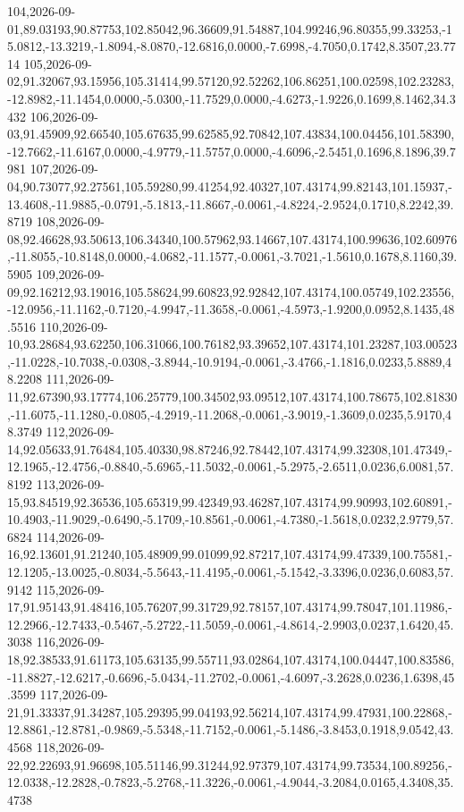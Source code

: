 \documentclass{eic-bcc-tcc}
\begin{document}
{104,2026-09-01,89.03193,90.87753,102.85042,96.36609,91.54887,104.99246,96.80355,99.33253,-15.0812,-13.3219,-1.8094,-8.0870,-12.6816,0.0000,-7.6998,-4.7050,0.1742,8.3507,23.7714
105,2026-09-02,91.32067,93.15956,105.31414,99.57120,92.52262,106.86251,100.02598,102.23283,-12.8982,-11.1454,0.0000,-5.0300,-11.7529,0.0000,-4.6273,-1.9226,0.1699,8.1462,34.3432
106,2026-09-03,91.45909,92.66540,105.67635,99.62585,92.70842,107.43834,100.04456,101.58390,-12.7662,-11.6167,0.0000,-4.9779,-11.5757,0.0000,-4.6096,-2.5451,0.1696,8.1896,39.7981
107,2026-09-04,90.73077,92.27561,105.59280,99.41254,92.40327,107.43174,99.82143,101.15937,-13.4608,-11.9885,-0.0791,-5.1813,-11.8667,-0.0061,-4.8224,-2.9524,0.1710,8.2242,39.8719
108,2026-09-08,92.46628,93.50613,106.34340,100.57962,93.14667,107.43174,100.99636,102.60976,-11.8055,-10.8148,0.0000,-4.0682,-11.1577,-0.0061,-3.7021,-1.5610,0.1678,8.1160,39.5905
109,2026-09-09,92.16212,93.19016,105.58624,99.60823,92.92842,107.43174,100.05749,102.23556,-12.0956,-11.1162,-0.7120,-4.9947,-11.3658,-0.0061,-4.5973,-1.9200,0.0952,8.1435,48.5516
110,2026-09-10,93.28684,93.62250,106.31066,100.76182,93.39652,107.43174,101.23287,103.00523,-11.0228,-10.7038,-0.0308,-3.8944,-10.9194,-0.0061,-3.4766,-1.1816,0.0233,5.8889,48.2208
111,2026-09-11,92.67390,93.17774,106.25779,100.34502,93.09512,107.43174,100.78675,102.81830,-11.6075,-11.1280,-0.0805,-4.2919,-11.2068,-0.0061,-3.9019,-1.3609,0.0235,5.9170,48.3749
112,2026-09-14,92.05633,91.76484,105.40330,98.87246,92.78442,107.43174,99.32308,101.47349,-12.1965,-12.4756,-0.8840,-5.6965,-11.5032,-0.0061,-5.2975,-2.6511,0.0236,6.0081,57.8192
113,2026-09-15,93.84519,92.36536,105.65319,99.42349,93.46287,107.43174,99.90993,102.60891,-10.4903,-11.9029,-0.6490,-5.1709,-10.8561,-0.0061,-4.7380,-1.5618,0.0232,2.9779,57.6824
114,2026-09-16,92.13601,91.21240,105.48909,99.01099,92.87217,107.43174,99.47339,100.75581,-12.1205,-13.0025,-0.8034,-5.5643,-11.4195,-0.0061,-5.1542,-3.3396,0.0236,0.6083,57.9142
115,2026-09-17,91.95143,91.48416,105.76207,99.31729,92.78157,107.43174,99.78047,101.11986,-12.2966,-12.7433,-0.5467,-5.2722,-11.5059,-0.0061,-4.8614,-2.9903,0.0237,1.6420,45.3038
116,2026-09-18,92.38533,91.61173,105.63135,99.55711,93.02864,107.43174,100.04447,100.83586,-11.8827,-12.6217,-0.6696,-5.0434,-11.2702,-0.0061,-4.6097,-3.2628,0.0236,1.6398,45.3599
117,2026-09-21,91.33337,91.34287,105.29395,99.04193,92.56214,107.43174,99.47931,100.22868,-12.8861,-12.8781,-0.9869,-5.5348,-11.7152,-0.0061,-5.1486,-3.8453,0.1918,9.0542,43.4568
118,2026-09-22,92.22693,91.96698,105.51146,99.31244,92.97379,107.43174,99.73534,100.89256,-12.0338,-12.2828,-0.7823,-5.2768,-11.3226,-0.0061,-4.9044,-3.2084,0.0165,4.3408,35.4738
}
\end{document}

